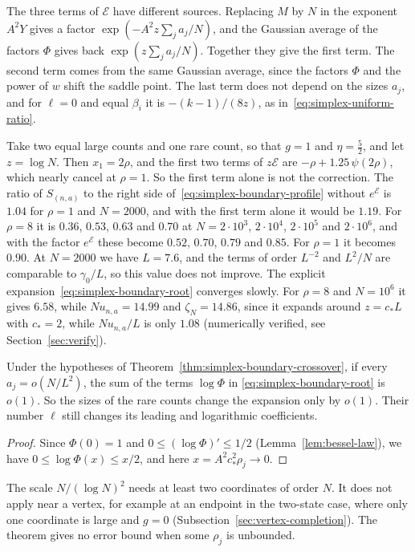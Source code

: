 \begin{remark}\label{rem:crossover-numbers}
The three terms of $\mathcal E$ have different sources. Replacing $M$ by $N$ in
the exponent $A^2Y$ gives a factor $\exp(-A^2z\sum_ja_j/N)$, and the Gaussian
average of the factors $\Phi$ gives back $\exp(z\sum_ja_j/N)$. Together they
give the first term. The second term comes from the same Gaussian average,
since the factors $\Phi$ and the power of $w$ shift the saddle point. The last
term does not depend on the sizes $a_j$, and for $\ell=0$ and equal $\beta_i$ it
is $-(k-1)/(8z)$, as in~\eqref{eq:simplex-uniform-ratio}.

Take two equal large counts and one rare count, so that $g=1$ and
$\eta=\frac52$, and let $z=\log N$. Then $x_1=2\rho$, and the first two terms of
$z\mathcal E$ are $-\rho+1.25\,\psi(2\rho)$, which nearly cancel at $\rho=1$. So
the first term alone is not the correction. The ratio of $S_{(n,a)}$ to the
right side of~\eqref{eq:simplex-boundary-profile} without $e^{\mathcal E}$ is
$1.04$ for $\rho=1$ and $N=2000$, and with the first term alone it would be
$1.19$. For $\rho=8$ it is $0.36$, $0.53$, $0.63$ and $0.70$ at $N=2\cdot10^3$,
$2\cdot10^4$, $2\cdot10^5$ and $2\cdot10^6$, and with the factor
$e^{\mathcal E}$ these become $0.52$, $0.70$, $0.79$ and $0.85$. For $\rho=1$
it becomes $0.90$. At $N=2000$ we have $L=7.6$, and the terms of order $L^{-2}$
and $L^2/N$ are comparable to $\gamma_0/L$, so this value does not improve. The
explicit
expansion~\eqref{eq:simplex-boundary-root} converges slowly. For $\rho=8$ and
$N=10^6$ it gives $6.58$, while $Nu_{n,a}=14.99$ and $\zeta_N=14.86$, since it
expands around $z=c_*L$ with $c_*=2$, while $Nu_{n,a}/L$ is only $1.08$
(numerically verified, see Section~\ref{sec:verify}).
\end{remark}

\begin{corollary}
\label{cor:simplex-rare-invisibility}
Under the hypotheses of Theorem~\ref{thm:simplex-boundary-crossover}, if
every $a_j=o(N/L^2)$, the sum of the terms $\log\Phi$ in
\eqref{eq:simplex-boundary-root} is $o(1)$. So the sizes of the rare counts
change the expansion only by $o(1)$. Their number $\ell$ still changes its
leading and logarithmic coefficients.
\end{corollary}

\begin{proof}
Since $\Phi(0)=1$ and $0\le(\log\Phi)'\le1/2$ (Lemma~\ref{lem:bessel-law}),
we have $0\le\log\Phi(x)\le x/2$, and here $x=A^2c_*^2\rho_j\to0$.
\end{proof}

The scale $N/(\log N)^2$ needs at least two coordinates of order $N$. It does
not apply near a vertex, for example at an endpoint in the two-state case,
where only one coordinate is large and $g=0$
(Subsection~\ref{sec:vertex-completion}). The theorem gives no error bound
when some $\rho_j$ is unbounded.
